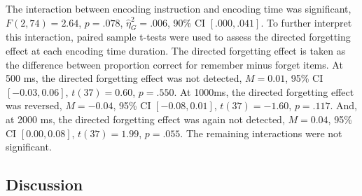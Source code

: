 \documentclass[
  man,floatsintext]{apa6}
\begin{document}
The interaction between encoding instruction and encoding time was significant, \(F(2, 74) = 2.64\), \(p = .078\), \(\hat{\eta}^2_G = .006\), 90\% CI \([.000, .041]\). To further interpret this interaction, paired sample t-tests were used to assess the directed forgetting effect at each encoding time duration. The directed forgetting effect is taken as the difference between proportion correct for remember minus forget items. At 500 ms, the directed forgetting effect was not detected, \(M = 0.01\), 95\% CI \([-0.03, 0.06]\), \(t(37) = 0.60\), \(p = .550\). At 1000ms, the directed forgetting effect was reversed, \(M = -0.04\), 95\% CI \([-0.08, 0.01]\), \(t(37) = -1.60\), \(p = .117\). And, at 2000 ms, the directed forgetting effect was again not detected, \(M = 0.04\), 95\% CI \([0.00, 0.08]\), \(t(37) = 1.99\), \(p = .055\). The remaining interactions were not significant.

\hypertarget{discussion}{%
\subsection{Discussion}\label{discussion}}
\end{document}
